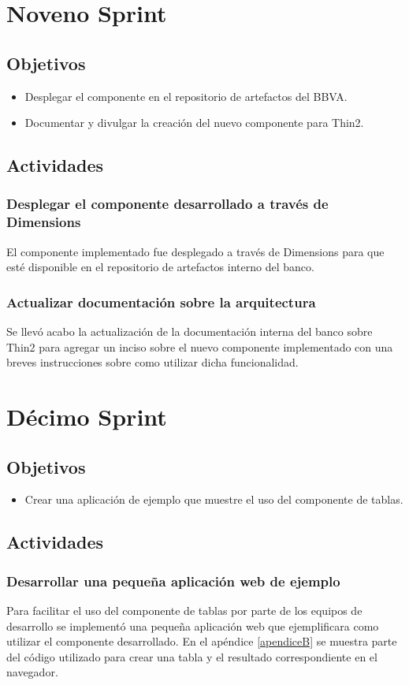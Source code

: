 \section{Noveno Sprint}

\subsection{Objetivos}
\begin{itemize}
  \item Desplegar el componente en el repositorio de artefactos del BBVA.
  \item Documentar y divulgar la creación del nuevo componente para Thin2.
\end{itemize}
\subsection{Actividades}
\subsubsection{Desplegar el componente desarrollado a través de Dimensions}
El componente implementado fue desplegado a través de Dimensions para que esté
disponible en el repositorio de artefactos interno del banco.
\subsubsection{Actualizar documentación sobre la arquitectura}
Se llevó acabo la actualización de la documentación interna del banco sobre
Thin2 para agregar un inciso sobre el nuevo componente implementado con
una breves instrucciones sobre como utilizar dicha funcionalidad.

\section{Décimo Sprint}

\subsection{Objetivos}
\begin{itemize}
  \item Crear una aplicación de ejemplo que muestre el uso del componente de tablas.
\end{itemize}
\subsection{Actividades}
\subsubsection{Desarrollar una pequeña aplicación web de ejemplo}
Para facilitar el uso del componente de tablas por parte de los equipos de
desarrollo se implementó una pequeña aplicación web que ejemplificara
como utilizar el componente desarrollado. En el apéndice \ref{apendiceB} se muestra parte
del código utilizado para crear una tabla y el resultado correspondiente en el navegador.
